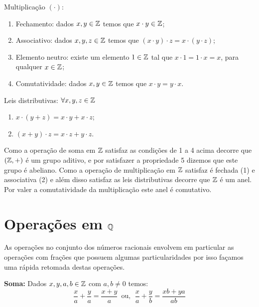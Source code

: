   Multiplicação $(\cdot)$:
 \begin{enumerate}[1)]
 \item Fechamento: dados $x, y \in \mathbb{Z}$ temos que $x \cdot y \in \mathbb{Z}$;
 \item Associativo: dados $x, y, z \in \mathbb{Z}$ temos que $(x \cdot y) \cdot z= x \cdot (y \cdot z)$;
 \item Elemento neutro: existe um elemento $1 \in \mathbb{Z}$ tal que $x \cdot 1= 1 \cdot x= x$, para qualquer $x \in \mathbb{Z}$;
 \item Comutatividade: dados $x, y \in \mathbb{Z}$ temos que $x \cdot y= y \cdot x$.
 \end{enumerate}

  Leis distributivas: $\forall x, y, z \in \mathbb{Z}$
 \begin{enumerate}[1)]
 \item $x \cdot (y + z)= x \cdot y + x \cdot z$;
 \item $(x + y) \cdot z= x \cdot z + y \cdot z$.
 \end{enumerate}

  Como a operação de soma em $\mathbb{Z}$ satisfaz as condições de 1 a 4 acima decorre que $(\mathbb{Z}, +)$ é um grupo aditivo, e por satisfazer a propriedade 5 dizemos que este grupo é abeliano. Como a operação de multiplicação em $\mathbb{Z}$ satisfaz é fechada (1) e associativa (2) e além disso satisfaz as leis distributivas decorre que $\mathbb{Z}$ é um anel. Por valer a comutatividade da multiplicação este anel é comutativo.


 \section{Operações em \texorpdfstring{$\mathbb{Q}$}{Q}}

 As operações no conjunto dos números racionais envolvem em particular as operações com frações que possuem algumas particularidades por isso façamos uma rápida retomada destas operações.

 \vskip0.3cm

 \colorbox{azul}{
 \begin{minipage}{0.9\linewidth}
 \begin{center}
  \textbf{Soma:} Dados $x, y, a, b \in \mathbb{Z}$ com $a, b \neq 0$ temos:
 \[\frac{x}{a} + \frac{y}{a}= \frac{x+y}{a} \, \text{ ou}, \ \
  \frac{x}{a} + \frac{y}{b}= \frac{xb + ya}{ab} \]
 \end{center}
 \end{minipage}}

 \vskip0.3cm

